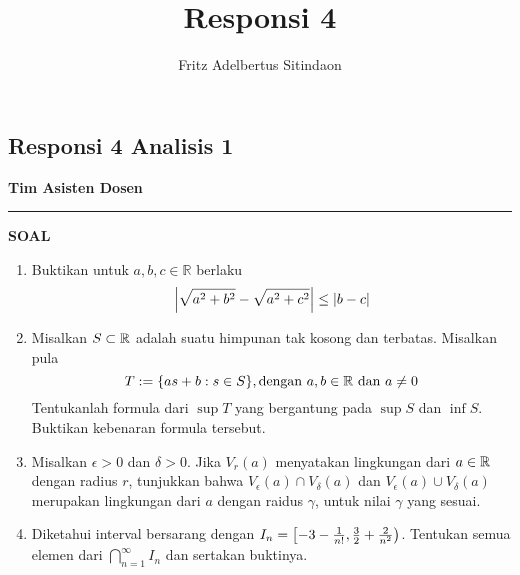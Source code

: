 \documentclass{article}
\title{Responsi 4}
\author{Fritz Adelbertus Sitindaon}
\date{}
\begin{document}
\begin{flushright}
    \section*{Responsi 4 Analisis 1}
    \textbf{Tim Asisten Dosen}
\end{flushright}


\vspace{0.5cm}\hrule height 2pt\vspace{0.5cm}



\begin{center}
\textbf{\large{SOAL}}
\end{center}
\begin{enumerate}[leftmargin=*, label={\arabic*}.]
\item Buktikan untuk $a,b,c \in \mathbb{R}$ berlaku
\[
    \abs*{\sqrt{a^2+b^2}-\sqrt{a^2+c^2}} \leq \abs{b-c}
\]
\item Misalkan $S \subset \R$ adalah suatu himpunan tak kosong dan terbatas. Misalkan pula
\[
    T := \{as+b: s\in S\}, \text{dengan } a,b\in \R \text{ dan } a\neq 0
\]
Tentukanlah formula dari $\sup T$ yang bergantung pada $\sup S$ dan $\inf S$. Buktikan kebenaran formula tersebut.

\item Misalkan $\epsilon > 0$ dan $\delta > 0$. Jika $V_r(a)$ menyatakan lingkungan 
dari $a \in \R$ dengan radius $r$, tunjukkan bahwa $V_\epsilon(a)\cap V_\delta(a)$ 
dan $V_\epsilon(a) \cup V_\delta(a)$ merupakan lingkungan dari $a$ dengan raidus 
$\gamma$, untuk nilai $\gamma$ yang sesuai.

\item Diketahui interval bersarang dengan $I_n = \cio*{-3-\frac{1}{n!},\frac{3}{2}+\frac{2}{n^2}}$. 
Tentukan semua elemen dari $\bigcap_{n=1}^{\infty}I_n$ dan sertakan buktinya.





\end{enumerate}
\end{document}
